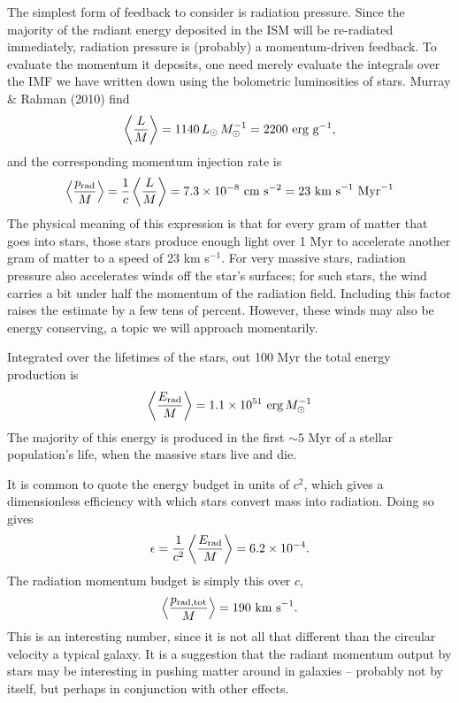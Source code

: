 The simplest form of feedback to consider is radiation pressure. Since the majority of the radiant energy deposited in the ISM will be re-radiated immediately, radiation pressure is (probably) a momentum-driven feedback. To evaluate the momentum it deposits, one need merely evaluate the integrals over the IMF we have written down using the bolometric luminosities of stars. Murray \& Rahman (2010) find
\begin{equation}
\left\langle \frac{L}{M}\right \rangle = 1140 \,L_{\odot}\,M_{\odot}^{-1} = 2200\mbox{ erg g}^{-1},
\end{equation}
and the corresponding momentum injection rate is
\begin{equation}
\left\langle \frac{p_{\rm rad}}{M}\right \rangle = \frac{1}{c} \left\langle \frac{L}{M}\right \rangle = 7.3\times 10^{-8}\mbox{ cm s}^{-2} = 23\mbox{ km s}^{-1}\mbox{ Myr}^{-1}
\end{equation}
The physical meaning of this expression is that for every gram of matter that goes into stars, those stars produce enough light over 1 Myr to accelerate another gram of matter to a speed of 23 km s$^{-1}$. For very massive stars, radiation pressure also accelerates winds off the star's surfaces; for such stars, the wind carries a bit under half the momentum of the radiation field. Including this factor raises the estimate by a few tens of percent.  However, these winds may also be energy conserving, a topic we will approach momentarily.

Integrated over the lifetimes of the stars, out 100 Myr the total energy production is
\begin{equation}
\left\langle \frac{E_{\rm rad}}{M}\right\rangle = 1.1\times 10^{51}\mbox{ erg}\,M_{\odot}^{-1}
\end{equation}
The majority of this energy is produced in the first $\sim 5$ Myr of a stellar population's life, when the massive stars live and die.

It is common to quote the energy budget in units of $c^2$, which gives a dimensionless efficiency with which stars convert mass into radiation. Doing so gives
\begin{equation}
\epsilon = \frac{1}{c^2} \left\langle \frac{E_{\rm rad}}{M}\right\rangle = 6.2\times 10^{-4}.
\end{equation}
The radiation momentum budget is simply this over $c$,
\begin{equation}
\left\langle \frac{p_{\rm rad,tot}}{M}\right\rangle = 190\mbox{ km s}^{-1}.
\end{equation}
This is an interesting number, since it is not all that different than the circular velocity a typical galaxy. It is a suggestion that the radiant momentum output by stars may be interesting in pushing matter around in galaxies -- probably not by itself, but perhaps in conjunction with other effects.

